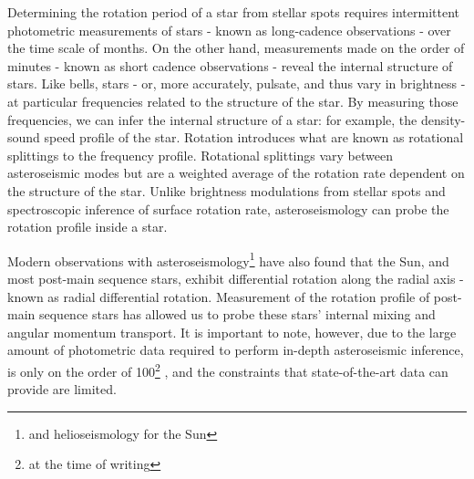 
Determining the rotation period of a star from stellar spots requires intermittent photometric measurements of stars - known as long-cadence observations - over the time scale of months. 
On the other hand, measurements made on the order of minutes - known as short cadence observations - reveal the internal structure of stars.
Like bells, stars  - or, more accurately, pulsate, and thus vary in brightness -  at particular frequencies related to the structure of the star.
By measuring those frequencies, we can infer the internal structure of a star: for example, the density-sound speed profile of the star.
Rotation introduces what are known as rotational splittings to the frequency profile.
Rotational splittings vary between asteroseismic modes but are a weighted average of the rotation rate dependent on the structure of the star. 
Unlike brightness modulations from stellar spots and spectroscopic inference of surface rotation rate, asteroseismology can probe the rotation profile inside a star.

Modern observations with asteroseismology\footnote{and helioseismology for the Sun} have also found that the Sun, and most post-main sequence stars, exhibit differential rotation along the radial axis - known as radial differential rotation.
Measurement of the rotation profile of post-main sequence stars has allowed us to probe these stars' internal mixing and angular momentum transport. 
It is important to note, however, due to the large amount of photometric data required to perform in-depth asteroseismic inference,  is only on the order of 100\footnote{at the time of writing} \citep{li_asteroseismology_2020,li_asteroseismology_2020-1}, and the constraints that state-of-the-art data can provide are limited.

